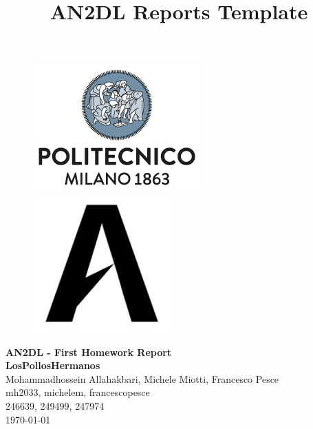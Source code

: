 \documentclass[11pt]{article}
\title{AN2DL Reports Template}
\begin{document}
\begin{figure}[H]
      \raggedright
      \includegraphics[scale=0.4]{polimi.png} \hfill
      \includegraphics[scale=0.3]{airlab.jpeg}
\end{figure}

\vspace{5mm}

\begin{center}
      {\Large \textbf{AN2DL - First Homework Report}}\\
      \vspace{2mm}
      {\Large \textbf{LosPollosHermanos}}\\
      \vspace{2mm}
      {\large Mohammadhossein Allahakbari,}
      {\large Michele Miotti,}
      {\large Francesco Pesce}\\
      \vspace{2mm}
      {mh2033,}
      {michelem,}
      {francescopesce}\\
      \vspace{2mm}
      {246639,}
      {249499,}
      {247974}\\
      \vspace{5mm}
      \today
\end{center}
\vspace{5mm}
\end{document}
